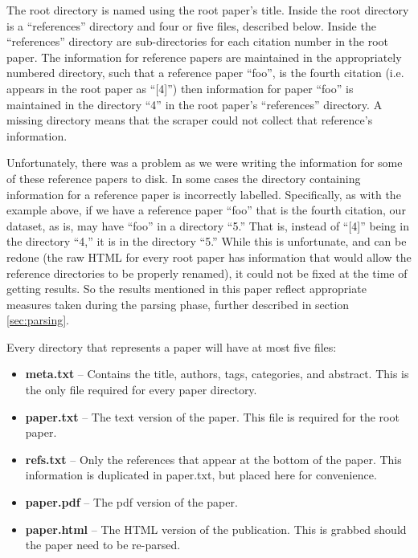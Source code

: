 \documentclass[10pt, conference, compsocconf]{IEEEtran}
\begin{document}
The root directory is named using the root paper's title. Inside the root
directory is a ``references'' directory and four or five files, described
below. Inside the ``references'' directory are sub-directories for each
citation number in the root paper. The information for reference papers are
maintained in the appropriately numbered directory, such that a reference paper
``foo'', is the fourth citation (i.e. appears in the root paper as ``[4]'')
then information for paper ``foo'' is maintained in the directory ``4'' in the
root paper's ``references'' directory. A missing directory
means that the scraper could not collect that reference's information.

Unfortunately, there was a problem as we were writing the information for some
of these reference papers to disk. In some cases the directory containing information for a
reference paper is incorrectly labelled. Specifically, as with the example
above, if we have a reference paper ``foo'' that is the fourth citation, our
dataset, as is, may have ``foo'' in a directory ``5.'' That is, instead of
``[4]'' being in the directory ``4,'' it is in the directory ``5.'' While this
is unfortunate, and can be redone (the raw HTML for every root paper has
information that would allow the reference directories to be properly renamed),
it could not be fixed at the time of getting results. So the results mentioned
in this paper reflect appropriate measures taken during the parsing phase,
further described in section \ref{sec:parsing}.

Every directory that represents a paper will have at most five files:
\begin{itemize}
   \item \textbf{meta.txt}\footnotemark[1]{} -- Contains the title, authors,
                                                tags, categories, and abstract.
                                                This is the only file required
                                                for every paper directory.
   \item \textbf{paper.txt}\footnotemark[1]{} -- The text version of the paper.
                                                 This file is required for the
                                                 root paper.
   \item \textbf{refs.txt}\footnotemark[1]{} -- Only the references that appear
                                                at the bottom of the paper.
                                                This information is duplicated
                                                in paper.txt, but placed here
                                                for convenience.
   \item \textbf{paper.pdf} -- The pdf version of the paper.
   \item \textbf{paper.html} -- The HTML version of the publication. This is
                                grabbed should the paper need to be re-parsed.
\end{itemize}
\end{document}
